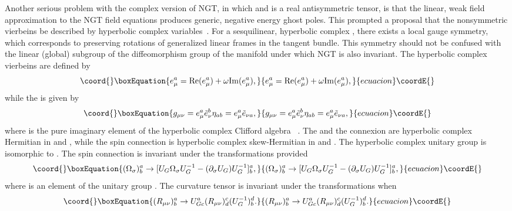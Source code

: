 \documentclass[a4paper,10pt]{article}
\begin{document}
Another serious problem with the complex version of NGT, in which
\coordHE{} and \coordHE{} is a real antisymmetric
tensor, is that the linear, weak field approximation to the NGT field
equations produces generic, negative energy ghost poles. This prompted a
proposal that the nonsymmetric vierbeins be described by hyperbolic complex
variables~\cite{Moffat6,Moffat7}. For a sesquilinear, hyperbolic complex
\coordHE{}, there exists a local \coordHE{} gauge symmetry, which
corresponds to \coordHE{} preserving rotations of generalized linear
frames in the tangent bundle. This symmetry should not be confused with the
linear (global) subgroup \coordHE{} of the diffeomorphism group of the
manifold \coordHE{} under which NGT is also invariant. The hyperbolic
complex vierbeins are defined by
\begin{equation}\coord{}\boxEquation{
e^a_\mu={\rm Re}(e^a_\mu)+\omega{\rm Im}(e^a_\mu),
}{
e^a_\mu={\rm Re}(e^a_\mu)+\omega{\rm Im}(e^a_\mu),
}{ecuacion}\coordE{}\end{equation}
while the \coordHE{} is given by
\begin{equation}\coord{}\boxEquation{
g_{\mu\nu}=e^a_\mu{\tilde e}^b_\nu\eta_{ab}=e^a_\mu{\tilde e}_{\nu a},
}{
g_{\mu\nu}=e^a_\mu{\tilde e}^b_\nu\eta_{ab}=e^a_\mu{\tilde e}_{\nu a},
}{ecuacion}\coordE{}\end{equation}
where \coordHE{} is the pure imaginary element of the hyperbolic complex
Clifford algebra \myHighlight{$\Omega$}\coordHE{}~\cite{Clifford}. The \coordHE{} and the
connexion \myHighlight{$\Gamma^\lambda_{\mu\nu}$}\coordHE{} are hyperbolic complex Hermitian in
\myHighlight{$\mu$}\coordHE{} and \myHighlight{$\nu$}\coordHE{}, while the spin connection \coordHE{} is
hyperbolic complex skew-Hermitian in \coordHE{} and \coordHE{}. The hyperbolic complex
unitary group \coordHE{} is isomorphic to \coordHE{}. The spin
connection \coordHE{} is invariant under the \coordHE{}
transformations provided \begin{equation}\coord{}\boxEquation{
(\Omega_\sigma)^a_b\rightarrow[U_G\Omega_\sigma U_G^{-1}-(\partial_\sigma
U_G)U_G^{-1}]^a_b,
}{
(\Omega_\sigma)^a_b\rightarrow[U_G\Omega_\sigma U_G^{-1}-(\partial_\sigma
U_G)U_G^{-1}]^a_b,
}{ecuacion}\coordE{}\end{equation}
where \coordHE{} is an element of the unitary group \coordHE{}. The
curvature tensor \coordHE{} is invariant under the \coordHE{}
transformations when
\begin{equation}\coord{}\boxEquation{
(R_{\mu\nu})^a_b\rightarrow U^a_{Gc}(R_{\mu\nu})^c_d(U_G^{-1})^d_b.
}{
(R_{\mu\nu})^a_b\rightarrow U^a_{Gc}(R_{\mu\nu})^c_d(U_G^{-1})^d_b.
}{ecuacion}\coordE{}\end{equation}
\end{document}
